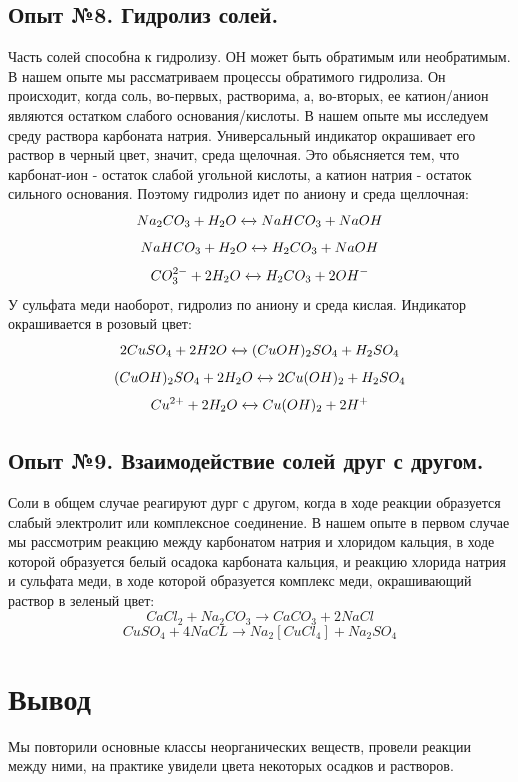 \documentclass[a4paper, 12pt]{article}
\begin{document}
\subsection{Опыт №8. Гидролиз солей.}
Часть солей способна к гидролизу. ОН может быть обратимым или необратимым. В нашем опыте мы рассматриваем процессы обратимого гидролиза. Он происходит, когда соль, во-первых, растворима, а, во-вторых, ее катион/анион являются остатком слабого основания/кислоты. В нашем опыте мы исследуем среду раствора карбоната натрия. Универсальный индикатор окрашивает его раствор в черный цвет, значит, среда щелочная. Это обьясняется тем, что карбонат-ион - остаток слабой угольной кислоты, а катион натрия - остаток сильного основания. Поэтому гидролиз идет по аниону и среда щеллочная:
\begin{equation}
    Na_2 CO_3 + H_2 O \xleftrightarrow{}{} NaHCO_3 +NaOH 
\end{equation}
\begin{equation}
    NaHCO_3 + H_2 O \xleftrightarrow{}{}  H_2 CO_3 + NaOH 
\end{equation}
\begin{equation}
    CO_3^{2-} + 2H_2 O \xleftrightarrow{}{} H_2 CO_3 + 2 OH^{-}
\end{equation}
У сульфата меди наоборот, гидролиз по аниону и среда кислая. Индикатор окрашивается в розовый цвет:
\begin{equation}
    2CuSO_4 + 2H2O \xleftrightarrow{}{} (CuOH)_2 SO_4 + H_2 SO_4
\end{equation}
\begin{equation}
    (CuOH)_2 SO_4 + 2H_2 O \xleftrightarrow{}{}  2Cu(OH)_2 + H_2 SO_4
\end{equation}
\begin{equation}
    Cu^{2+} + 2H_2 O \xleftrightarrow{}{}  Cu(OH)_2 + 2H^{+}
\end{equation}
\subsection{Опыт №9. Взаимодействие солей друг с другом.}
Соли в общем случае реагируют дург с другом, когда в ходе реакции образуется слабый электролит или комплексное соединение. В нашем опыте в первом случае мы рассмотрим реакцию между карбонатом натрия и хлоридом кальция, в ходе которой образуется белый осадока карбоната кальция, и реакцию хлорида натрия и сульфата меди, в ходе которой образуется комплекс меди, окрашивающий раствор в зеленый цвет:
\begin{equation}
    CaCl_2 + Na_2 CO_3 \xrightarrow{} CaCO_3 + 2NaCl
\end{equation}
\begin{equation}
    CuSO_4 + 4NaCL \xrightarrow{} Na_2 [CuCl_4] + Na_2 SO_4
\end{equation}
\section{Вывод}
Мы повторили основные классы неорганических веществ, провели реакции между ними, на практике увидели цвета некоторых осадков и растворов.
    
\end{document}
